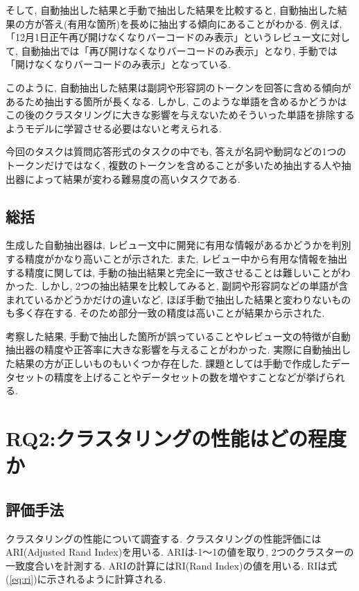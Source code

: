 そして, 自動抽出した結果と手動で抽出した結果を比較すると, 自動抽出した結果の方が答え(有用な箇所)を長めに抽出する傾向にあることがわかる. 
例えば, 「12月1日正午再び開けなくなりバーコードのみ表示」というレビュー文に対して, 自動抽出では「再び開けなくなりバーコードのみ表示」となり, 手動では「開けなくなりバーコードのみ表示」となっている. 

このように, 自動抽出した結果は副詞や形容詞のトークンを回答に含める傾向があるため抽出する箇所が長くなる. しかし, このような単語を含めるかどうかはこの後のクラスタリングに大きな影響を与えないためそういった単語を排除するようモデルに学習させる必要はないと考えられる. 

今回のタスクは質問応答形式のタスクの中でも, 答えが名詞や動詞などの1つのトークンだけではなく, 複数のトークンを含めることが多いため抽出する人や抽出器によって結果が変わる難易度の高いタスクである. 


\subsection{総括}
生成した自動抽出器は, レビュー文中に開発に有用な情報があるかどうかを判別する精度がかなり高いことが示された. 
また, レビュー中から有用な情報を抽出する精度に関しては, 手動の抽出結果と完全に一致させることは難しいことがわかった. しかし, 2つの抽出結果を比較してみると, 副詞や形容詞などの単語が含まれているかどうかだけの違いなど, ほぼ手動で抽出した結果と変わりないものも多く存在する. そのため部分一致の精度は高いことが結果から示された. 

考察した結果, 手動で抽出した箇所が誤っていることやレビュー文の特徴が自動抽出器の精度や正答率に大きな影響を与えることがわかった. 実際に自動抽出した結果の方が正しいものもいくつか存在した. 課題としては手動で作成したデータセットの精度を上げることやデータセットの数を増やすことなどが挙げられる. 


\section{RQ2:クラスタリングの性能はどの程度か}
\subsection{評価手法}
クラスタリングの性能について調査する. クラスタリングの性能評価にはARI(Adjusted Rand Index)を用いる. ARIは-1〜1の値を取り, 2つのクラスターの一致度合いを計測する. 
ARIの計算にはRI(Rand Index)の値を用いる. RIは式(\ref{eq:ri})に示されるように計算される. 

